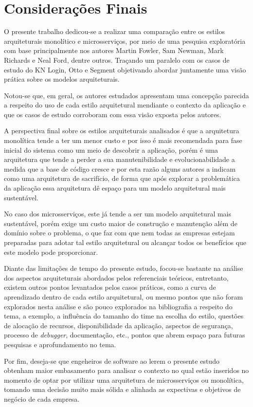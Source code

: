 \chapter{Considerações Finais}

O presente trabalho dedicou-se a realizar uma comparação entre os estilos arquiteturais monolítico e
microsserviços, por meio de uma pesquisa exploratória com base principalmente nos autores Martin Fowler,
Sam Newman, Mark Richards e Neal Ford, dentre outros. Traçando um paralelo com os casos de estudo do
KN Login, Otto e Segment objetivando abordar juntamente uma visão prática sobre os modelos arquiteturais.

Notou-se que, em geral, os autores estudados apresentam uma concepção parecida a respeito do
uso de cada estilo arquitetural mendiante o contexto da aplicação e que os casos de estudo
corroboram com essa visão exposta pelos autores.

A perspectiva final sobre os estilos arquiteturais analisados é que a arquitetura monolítica tende a
ter um menor custo e por isso é mais recomendada para fase inicial do sistema como um meio de
descobrir a aplicação, porém é uma arquitetura que tende a perder a sua manutenibilidade e
evolucionabilidade a medida que a base de código cresce e por esta razão alguns autores a indicam como uma
arquitetura de sacrifício, de forma que após explorar a problemática da aplicação essa arquitetura
dê espaço para um modelo arquitetural mais sustentável.

No caso dos microsserviços, este já tende a ser um modelo arquitetural mais sustentável, porém exige
um custo maior de construção e manutenção além de domínio sobre o problema, o que faz com que nem todas
as empresas estejam preparadas para adotar tal estilo arquitetural ou alcançar todos os benefícios
que este modelo pode proporcionar.

Diante das limitações de tempo do presente estudo, focou-se bastante na análise dos aspectos
arquiteturais abordados pelos referenciais teóricos, entretanto, existem outros pontos levantados
pelos casos práticos, como a curva de aprendizado dentro de cada estilo arquitetural, ou mesmo pontos que
não foram explorados nesta análise e são pouco explorados na bibliografia a respeito do tema, a exemplo,
a influência do tamanho do time na escolha do estilo, questões de alocação de recursos, disponibilidade
da aplicação, aspectos de segurança, processo de \textit{debugger}, documentação, etc., pontos que abrem
espaço para futuras pesquisas e aprofundamento no tema.

Por fim, deseja-se que engeheiros de software ao lerem o presente estudo obtenham maior embasamento
para analisar o contexto no qual estão inseridos no momento de optar por utilizar uma arquitetura de
microsserviços ou monolítica, tomando uma decisão muito mais sólida e alinhada as expectivas e objetivos
de negócio de cada empresa.
